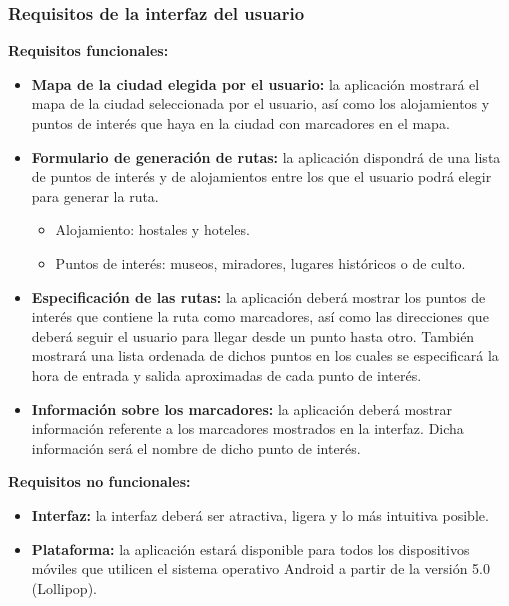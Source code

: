 \subsubsection[Requisitos interfaz]{Requisitos de la interfaz del usuario}
\textbf{Requisitos funcionales:}
\begin{itemize}
	\item \textbf{Mapa de la ciudad elegida por el usuario:} la aplicación mostrará el mapa de la ciudad seleccionada por el usuario, así como los alojamientos y puntos de interés que haya en la ciudad con marcadores en el mapa.
	\item\textbf{ Formulario de generación de rutas:} la aplicación dispondrá de una lista de puntos de interés y de alojamientos entre los que el usuario podrá elegir para generar la ruta. 
	\begin{itemize}
		\item Alojamiento: hostales y hoteles.
		\item Puntos de interés: museos, miradores, lugares históricos o de culto.
	\end{itemize}
	\item\textbf{ Especificación de las rutas:} la aplicación deberá mostrar los puntos de interés que contiene la ruta como marcadores, así como las direcciones que deberá seguir el usuario para llegar desde un punto hasta otro. También mostrará una lista ordenada de dichos puntos en los cuales se especificará la hora de entrada y salida aproximadas de cada punto de interés.
	\item \textbf{Información sobre los marcadores:} la aplicación deberá mostrar información referente a los marcadores mostrados en la interfaz. Dicha información será el nombre de dicho punto de interés.
\end{itemize}
\textbf{Requisitos no funcionales:}
\begin{itemize}
	\item \textbf{Interfaz:} la interfaz deberá ser atractiva, ligera y lo más intuitiva posible.
	\item \textbf{Plataforma:} la aplicación estará disponible para todos los dispositivos móviles que utilicen el sistema operativo Android a partir de la versión 5.0 (Lollipop).
\end{itemize}

